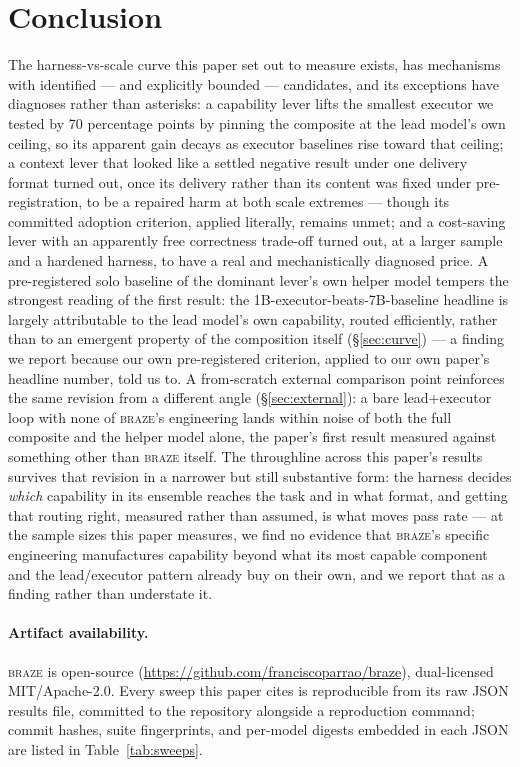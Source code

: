 \documentclass[smallcondensed,natbib]{svjour3}
\newcommand{\braze}{\textsc{braze}}
\begin{document}
\section{Conclusion}\label{sec:conclusion}

The harness-vs-scale curve this paper set out to measure exists, has
mechanisms with identified --- and explicitly bounded --- candidates,
and its exceptions have diagnoses rather than asterisks: a capability
lever lifts the smallest executor we tested by 70 percentage points by
pinning the composite at the lead model's own ceiling, so its apparent
gain decays as executor baselines rise toward that ceiling; a context
lever that
looked like a settled negative result under one delivery format turned
out, once its delivery rather than its content was fixed under
pre-registration, to be a repaired harm at both scale extremes ---
though its committed adoption criterion, applied literally, remains
unmet; and a cost-saving lever with an
apparently free correctness trade-off turned out, at a larger sample
and a hardened harness, to have a real and mechanistically diagnosed
price. A pre-registered solo baseline of the dominant lever's own
helper model tempers the strongest reading of the first result: the
1B-executor-beats-7B-baseline headline is largely attributable to the
lead model's own capability, routed efficiently, rather than to an
emergent property of the composition itself (\S\ref{sec:curve}) --- a
finding we report because our own pre-registered criterion, applied to
our own paper's headline number, told us to. A from-scratch external
comparison point reinforces the same revision from a different angle
(\S\ref{sec:external}): a bare lead+executor loop with none of
\braze{}'s engineering lands within noise of both the full composite and
the helper model alone, the paper's first result measured against
something other than \braze{} itself. The throughline across this
paper's results survives that revision in a narrower but still
substantive form: the harness decides \emph{which} capability in its
ensemble
reaches the task and in what format, and getting that routing right,
measured rather than assumed, is what moves pass rate --- at the sample
sizes this paper measures, we find no evidence that \braze{}'s specific
engineering manufactures capability beyond what its most capable
component and the lead/executor pattern already buy on their own, and
we report that as a finding rather than understate it.

\paragraph{Artifact availability.} \braze{} is open-source
(\url{https://github.com/franciscoparrao/braze}), dual-licensed
MIT/Apache-2.0. Every
sweep this paper cites is reproducible from its raw JSON results file,
committed to the repository alongside a reproduction command; commit
hashes, suite fingerprints, and per-model digests embedded in each JSON
are listed in Table~\ref{tab:sweeps}.
\end{document}
